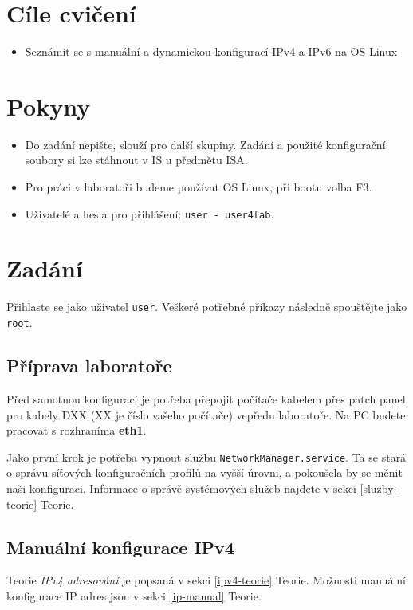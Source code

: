 \section*{Cíle cvičení}
\begin{itemize}
    \item Seznámit se s manuální a dynamickou konfigurací IPv4 a IPv6 na OS Linux
\end{itemize}

\section*{Pokyny}
\begin{itemize}
    \item Do zadání nepište, slouží pro další skupiny. Zadání a použité
        konfigurační soubory si lze stáhnout v IS u předmětu ISA.
    \item Pro práci v laboratoři budeme používat OS Linux, při bootu volba F3.
    \item Uživatelé a hesla pro přihlášení: \texttt{user - user4lab}.
\end{itemize}

\section{Zadání}
Přihlaste se jako uživatel \texttt{user}. Veškeré potřebné příkazy následně
spouštějte jako \texttt{root}.

\subsection{Příprava laboratoře}
Před samotnou konfigurací je potřeba přepojit počítače kabelem přes patch panel
pro kabely DXX (XX je číslo vašeho počítače) vepředu laboratoře. Na PC budete
pracovat s rozhraníma {\bf eth1}.

Jako první krok je potřeba vypnout službu \texttt{NetworkManager.service}. Ta
se stará o správu síťových konfiguračních profilů na vyšší úrovni, a pokoušela by
se měnit naši konfiguraci. Informace o správě systémových služeb najdete v
sekci \ref{sluzby-teorie} Teorie.

\subsection{Manuální konfigurace IPv4}

Teorie \emph{IPv4 adresování} je popsaná v sekci \ref{ipv4-teorie} Teorie.
Možnosti manuální konfigurace IP adres jsou v sekci \ref{ip-manual} Teorie.

